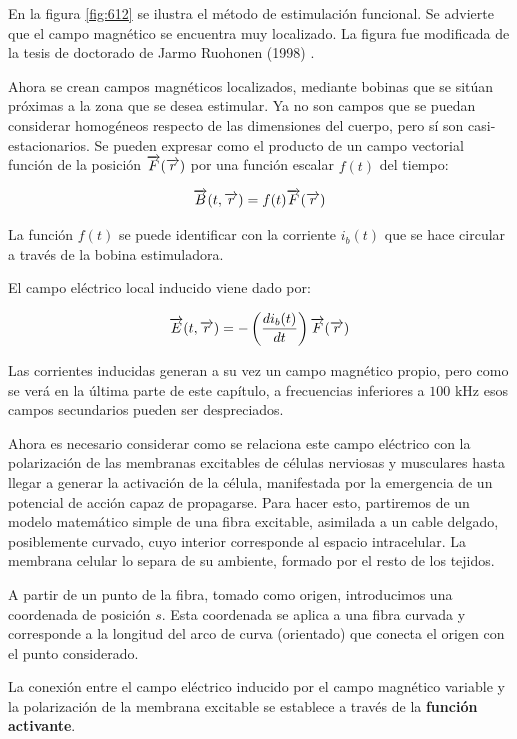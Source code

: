 En la figura \ref{fig:612} se ilustra el método de estimulación funcional. Se advierte que el campo magnético se encuentra muy localizado. La figura fue modificada de la tesis de doctorado de Jarmo Ruohonen (1998) \citep{Jarmo_Ruohonen_1998}.

Ahora se crean campos magnéticos localizados, mediante bobinas que se sitúan próximas a la zona que se desea estimular. Ya no son campos que se puedan considerar homogéneos respecto de las dimensiones del cuerpo, pero sí son casi-estacionarios.
Se pueden expresar como el producto de un campo vectorial función de la posición $\overrightarrow{F}(\overrightarrow{r})$ por una función escalar $f(t)$ del tiempo:

\begin{equation}
	\overrightarrow{B}(t, \overrightarrow{r}) = f(t) \overrightarrow{F}(\overrightarrow{r})
\end{equation}

La función $f(t)$ se puede identificar con la corriente $i_{b}(t)$ que se hace circular a través de la bobina estimuladora.

El campo eléctrico local inducido viene dado por:

\begin{equation}
	\overrightarrow{E}(t, \overrightarrow{r}) = -\left( \dfrac{di_{b}(t)}{dt} \right)  \overrightarrow{F}(\overrightarrow{r})
\end{equation}

Las corrientes inducidas generan a su vez un campo magnético propio, pero como se verá en la última parte de este capítulo, a frecuencias inferiores a $100$ kHz esos campos secundarios pueden ser despreciados.

Ahora es necesario considerar como se relaciona este campo eléctrico con la polarización de las membranas excitables de células nerviosas y musculares hasta llegar a generar la activación de la célula, manifestada por la emergencia de un potencial de acción capaz de propagarse.
Para hacer esto, partiremos de un modelo matemático simple de una fibra excitable, asimilada a un cable delgado, posiblemente curvado, cuyo interior corresponde al espacio intracelular. La membrana celular lo separa de su ambiente, formado por el resto de los tejidos.

A partir de un punto de la fibra, tomado como origen, introducimos una coordenada de posición $s$. Esta coordenada se aplica a una fibra curvada y corresponde a la longitud del arco de curva (orientado) que conecta el origen con el punto considerado.

La conexión entre el campo eléctrico inducido por el campo magnético variable y la polarización de la membrana excitable se establece a través de la \textbf{función activante}.

